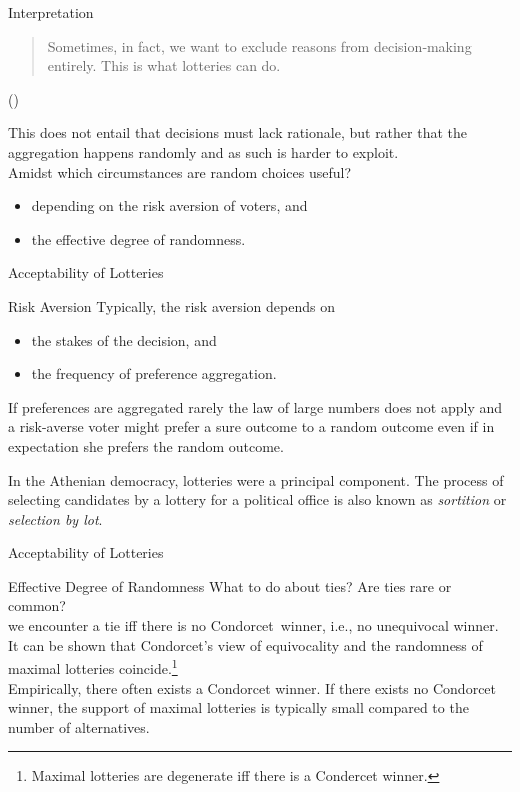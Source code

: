 \documentclass{beamer}
\theoremstyle{definition}
\def\g#1{{\usebeamercolor[fg]{block title example}{#1}}}
\begin{document}
\begin{frame}{Interpretation}
\blockquote{Sometimes, in fact, we want to exclude reasons from decision‐making entirely. This is what lotteries can do.}\par(\cite{Stone2011})\pause\vspace{10pt}

This does not entail that decisions must lack rationale, but rather that the aggregation happens randomly and as such is harder to exploit.\pause \\[20pt]

Amidst which circumstances are random choices useful?\pause
\begin{itemize}
    \item depending on the risk aversion of voters, and
    \item the effective degree of randomness.
\end{itemize}
\end{frame}

\begin{frame}{Acceptability of Lotteries}
\begin{block}{Risk Aversion}
Typically, the risk aversion depends on
\begin{itemize}
    \item the stakes of the decision\pause, and
    \item the frequency of preference aggregation.
\end{itemize}\pause

If preferences are aggregated rarely the law of large numbers does not apply and a risk-averse voter might prefer a sure outcome to a random outcome even if in expectation she prefers the random outcome.
\end{block}\pause\vspace{10pt}

In the Athenian democracy, lotteries were a principal component. The process of selecting candidates by a lottery for a political office is also known as \emph{sortition} or \emph{selection by lot}.
\end{frame}

\begin{frame}{Acceptability of Lotteries}
\begin{block}{Effective Degree of Randomness}
What to do about ties? Are ties rare or common?\pause \\[15pt]

\g{Condorcet view:} we encounter a tie iff there is no Condorcet~winner, i.e., no unequivocal winner.\pause \\[5pt]
It can be shown that Condorcet's view of equivocality and the randomness of maximal lotteries coincide.\footnote{Maximal lotteries are degenerate iff there is a Condercet winner.}\pause \\[15pt]

Empirically, there often exists a Condorcet winner. If there exists no Condorcet winner, the support of maximal lotteries is typically small compared to the number of alternatives.
\end{block}
\end{frame}
\end{document}
